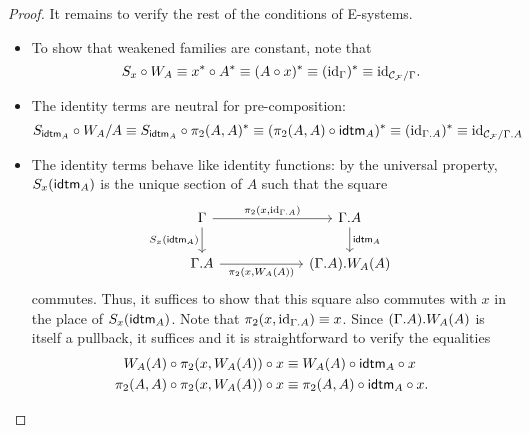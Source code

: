 \begin{proof}
It remains to verify the rest of the conditions of E-systems.
\begin{itemize}
\item To show that weakened families are constant, note that
\begin{equation*}
S_x\circ W_A\equiv x^\ast\circ A^\ast\equiv (A\circ x)^\ast\equiv ({\mathrm{id}_{\Gamma}})^\ast\equiv {\mathrm{id}_{\mathcal{C}_{\mathcal{F}}/\Gamma}}.
\end{equation*}
\item The identity terms are neutral for pre-composition:
\begin{equation*}
S_{\tfid{A}}\circ W_A/A \jdeq S_{\tfid{A}}\circ \pi_2(A,A)^\ast \jdeq (\pi_2(A,A)\circ\tfid{A})^\ast \jdeq
(\catid{\ctxext{\Gamma}{A}})^\ast \jdeq \catid{\cat{C}_{\cat{F}}/\ctxext{\Gamma}{A}} 
\end{equation*}
\item The identity terms behave like identity functions: by the universal property,
$S_x(\tfid{A})$ is the unique section of $A$ such that the square
\begin{equation*}
\begin{tikzcd}[column sep=6em]
\Gamma \arrow[d,swap,"{S_x(\tfid{A})}"] \arrow[r,"{\pi_2(x,\catid{\ctxext{\Gamma}{A}})}"] & \ctxext{\Gamma}{A} \arrow[d,"{\tfid{A}}"] \\
\ctxext{\Gamma}{A} \arrow[r,swap,"{\pi_2(x,W_A(A))}"] & \ctxext{{\Gamma}{A}}{W_A(A)}
\end{tikzcd}
\end{equation*}
commutes. Thus, it suffices to show that this square also commutes with $x$ in the place of
$S_x(\tfid{A})$. Note that $\pi_2(x,\catid{\ctxext{\Gamma}{A}})\jdeq x$. 
Since $\ctxext{{\Gamma}{A}}{W_A(A)}$ is itself a pullback, it suffices
and it is straightforward to verify the equalities
\begin{align*}
W_A(A)\circ\pi_2(x,W_A(A))\circ x & \jdeq W_A(A)\circ\idtm{A}\circ x \\
\pi_2(A,A)\circ\pi_2(x,W_A(A))\circ x & \jdeq \pi_2(A,A)\circ\idtm{A}\circ x.\qedhere
\end{align*}
\end{itemize}
\end{proof}



\begin{comment}
We then demonstrate how to define a category internal to a E-system. The main
point of this lies mainly in demonstrating how the operations of E-systems can
be used to define a category, because it is no surprise that a category can be
defined in type theory. Nevertheless, it is noteworthy that we need no further 
conditions on E-systems.
This is unlike the situation in category theory, where we need
to assume that the ambient category has finite limits in order to say what an
internal category is. In fact, it is possible to define a E-system internal
to a E-system, just using the algebraic structure of a E-system, and actually
defining an internal category was the hardest part of that definition.
\end{comment}

